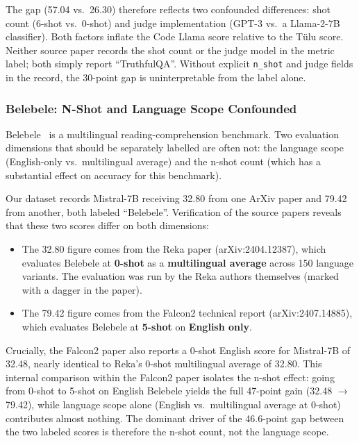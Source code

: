 \documentclass[11pt]{article}
\begin{document}
The gap (57.04 vs.\ 26.30) therefore reflects two confounded differences: shot
count (6-shot vs.\ 0-shot) and judge implementation (GPT-3 vs.\ a Llama-2-7B
classifier). Both factors inflate the Code Llama score relative to the Tülu
score. Neither source paper records the shot count or the judge model in the
metric label; both simply report ``TruthfulQA''. Without explicit
\texttt{n\_shot} and judge fields in the record, the 30-point gap is
uninterpretable from the label alone.

\subsubsection{Belebele: N-Shot and Language Scope Confounded}
\label{sec:belebele}

Belebele~\cite{bandarkar2023belebele} is a multilingual reading-comprehension
benchmark. Two evaluation dimensions that should be separately labelled are
often not: the language scope (English-only vs.\ multilingual average) and the
n-shot count (which has a substantial effect on accuracy for this benchmark).

Our dataset records Mistral-7B receiving 32.80 from one ArXiv paper and
79.42 from another, both labeled ``Belebele''. Verification of the source
papers reveals that these two scores differ on both dimensions:

\begin{itemize}
  \item The 32.80 figure comes from the Reka paper \citep{team2024reka}
    (arXiv:2404.12387), which evaluates Belebele at \textbf{0-shot} as a
    \textbf{multilingual average} across 150 language variants. The evaluation
    was run by the Reka authors themselves (marked with a dagger in the paper).
  \item The 79.42 figure comes from the Falcon2 technical report
    \citep{malartic2024falcon2} (arXiv:2407.14885), which evaluates Belebele
    at \textbf{5-shot} on \textbf{English only}.
\end{itemize}

Crucially, the Falcon2 paper also reports a 0-shot English score for
Mistral-7B of 32.48,  nearly identical to Reka's 0-shot multilingual average
of 32.80. This internal comparison within the Falcon2 paper isolates the
n-shot effect: going from 0-shot to 5-shot on English Belebele yields the
full 47-point gain (32.48 $\to$ 79.42), while language scope alone (English
vs.\ multilingual average at 0-shot) contributes almost nothing. The dominant
driver of the 46.6-point gap between the two labeled scores is therefore the
n-shot count, not the language scope.
\end{document}
